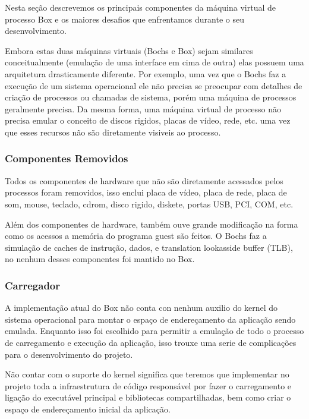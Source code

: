 \documentclass[11pt,twoside]{article}
\begin{document}
Nesta seção descrevemos os principais componentes da máquina virtual 
de processo Box e os maiores desafios que enfrentamos durante o seu 
desenvolvimento.

Embora estas duas máquinas virtuais (Bochs e Box) sejam similares 
conceitualmente (emulação de uma interface em cima de outra) elas
possuem uma arquitetura drasticamente diferente. Por exemplo, 
uma vez que o Bochs faz a execução de um sistema operacional ele
não precisa se preocupar com detalhes de criação de processos ou
chamadas de sistema, porém uma máquina de processos geralmente
precisa. Da mesma forma, uma máquina virtual de processo não precisa
emular o conceito de discos rigidos, placas de vídeo, rede, etc. uma
vez que esses recursos não são diretamente visiveis ao processo.


\subsubsection{Componentes Removidos}

Todos os componentes de hardware que não são diretamente acessados
pelos processos foram removidos, isso enclui placa de vídeo, placa de
rede, placa de som, mouse, teclado, cdrom, disco rigido, diskete, portas
USB, PCI, COM, etc.

Além dos componentes de hardware, também ouve grande modificação na 
forma como os acessos a memória do programa guest são feitos. O Bochs 
faz a simulação de caches de instrução, dados, e translation lookasside 
buffer (TLB), no nenhum desses componentes foi mantido no Box.

\subsubsection{Carregador}

A implementação atual do Box não conta con nenhum auxilio do kernel do
sistema operacional para montar o espaço de endereçamento da aplicação
sendo emulada. Enquanto isso foi escolhido para permitir a emulação de
todo o processo de carregamento e execução da aplicação, isso trouxe 
uma serie de complicações para o desenvolvimento do projeto.

Não contar com o suporte do kernel significa que teremos que implementar
no projeto toda a infraestrutura de código responsável por fazer o 
carregamento e ligação do executável principal e bibliotecas compartilhadas,
bem como criar o espaço de endereçamento inicial da aplicação.
\end{document}
